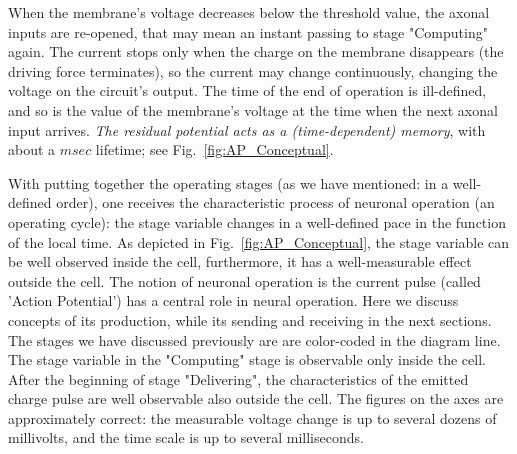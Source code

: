When the membrane's voltage decreases below the threshold value, 
the axonal inputs are re-opened, that may mean an instant passing
to stage "Computing" again. 
The current stops only when the charge on the membrane disappears (the driving force terminates),
so the current may change continuously, changing the voltage on the
circuit's output.
The time of the end of operation is ill-defined, and so is the
value of the membrane's voltage at the time when the next axonal input arrives. \textit{The residual potential acts as a (time-dependent) memory},
with about a $msec$ lifetime; see Fig.~\ref{fig:AP_Conceptual}.



With putting together the operating stages (as we have mentioned: in a well-defined order), one receives the
characteristic process of neuronal operation (an operating cycle): the stage variable changes in a well-defined pace in the function of the local time. As depicted in Fig.~\ref{fig:AP_Conceptual}, the stage variable can be well observed inside the cell, furthermore, it has a well-measurable effect outside the cell.  The notion 
of neuronal operation is the  current pulse (called 'Action Potential') has a central role in neural operation.  Here we discuss concepts of its production, while its sending and receiving in the next sections. The stages we have discussed previously are  are color-coded in the diagram line. 
The stage variable in the "Computing" stage is observable 
only inside the cell. After the beginning of stage "Delivering", the characteristics of the emitted charge pulse are well observable also outside the cell. The figures on the axes are approximately correct: the measurable voltage change is up to several dozens of millivolts, and the time scale
is up to several milliseconds. 

